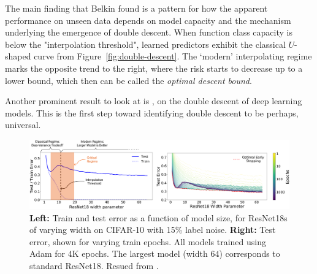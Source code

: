 \documentclass[10pt,oneside,oldfontcommands,dvipsnames,article]{memoir}
\begin{document}
The main finding that Belkin found is a pattern for how the apparent performance on unseen data depends on model capacity and the mechanism underlying the emergence of double descent. When function class capacity is below the "interpolation threshold", learned predictors exhibit the classical $U$-shaped curve from Figure~\ref{fig:double-descent}. The `modern' interpolating regime marks the opposite trend to the right, where the risk starts to decrease up to a lower bound, which then can be called the \textit{optimal descent bound}. 

Another prominent result to look at is \cite{nakkiran_deep_2019}, on the double descent of deep learning models. This is the first step toward identifying double descent to be perhaps, universal. 

\begin{figure}[H]
    \centering
    \includegraphics[width=1.05\textwidth]{img/errorvscomplexity.png}
    \caption{{\bf Left:} Train and test error as a function of model size,
    for ResNet18s of varying width 
    on CIFAR-10 with 15\% label noise.
    {\bf Right:}
    Test error, shown for varying train epochs.
    All models trained using Adam for 4K epochs.
    The largest model (width $64$) corresponds to standard ResNet18. Resued from \cite{nakkiran_deep_2019}.
    }
    \label{fig:errorvscomplexity}
\end{figure}
\end{document}
